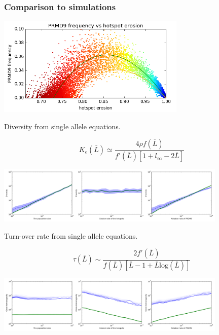 \documentclass[10pt]{beamer}
\begin{document}
\begin{frame}
	\frametitle{Comparison to simulations}
	\begin{center}
       \includegraphics[width=9cm]{Images/results.png}
	\end{center}
\end{frame}

\begin{frame}
	\begin{center}
		\Large
    Diversity from single allele equations.
	\end{center}
\[
  K_e(\bar{L}) \simeq 
  \dfrac{4 \rho f(\overline{L})}{f'(\overline{L})\left[ 1 + l_{\infty} - 2 \overline{L}  \right]}
\]
	\begin{center}
       \includegraphics[width=11cm]{Images/approximated-diversity.png}
	\end{center}
\end{frame}

\begin{frame}
	\begin{center}
		\Large
    Turn-over rate from single allele equations.
	\end{center}
\[
  \tau (\bar{L}) \sim \dfrac{2 f'(\overline{L})}{f(\overline{L})[\overline{L}-1 + \overline{L} \mathrm{log}(\overline{L})]}
\]
	\begin{center}
       \includegraphics[width=11cm]{Images/approximated-turn-over.png}
	\end{center}
\end{frame}
\end{document}
